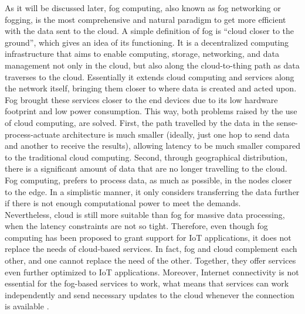 \noindent\tab As it will be discussed later, fog computing, also known as fog networking or fogging, is the most comprehensive and natural paradigm to get more efficient with the data sent to the cloud. A simple definition of fog is ``cloud closer to the ground'', which gives an idea of its functioning. It is a decentralized computing infrastructure that aims to enable computing, storage, networking, and data management not only in the cloud, but also along the cloud-to-thing path as data traverses to the cloud. Essentially it extends cloud computing and services along the network itself, bringing them closer to where data is created and acted upon. Fog brought these services closer to the end devices due to its low hardware footprint and low power consumption. This way, both problems raised by the use of cloud computing, are solved. First, the path travelled by the data in the sense-process-actuate architecture is much smaller (ideally, just one hop to send data and another to receive the results), allowing latency to be much smaller compared to the traditional cloud computing. Second, through geographical distribution, there is a significant amount of data that are no longer travelling to the cloud. Fog computing, prefers to process data, as much as possible, in the nodes closer to the edge. In a simplistic manner, it only considers transferring the data further if there is not enough computational power to meet the demands.\\
\noindent\tab Nevertheless, cloud is still more suitable than fog for massive data processing, when the latency constraints are not so tight. Therefore, even though fog computing has been proposed to grant support for IoT applications, it does not replace the needs of cloud-based services. In fact, fog and cloud complement each other, and one cannot replace the need of the other. Together, they offer services even further optimized to IoT applications. Moreover, Internet connectivity is not essential for the fog-based services to work, what means that services can work independently and send necessary updates to the cloud whenever the connection is available \cite{yousefpour2018all}.\\
